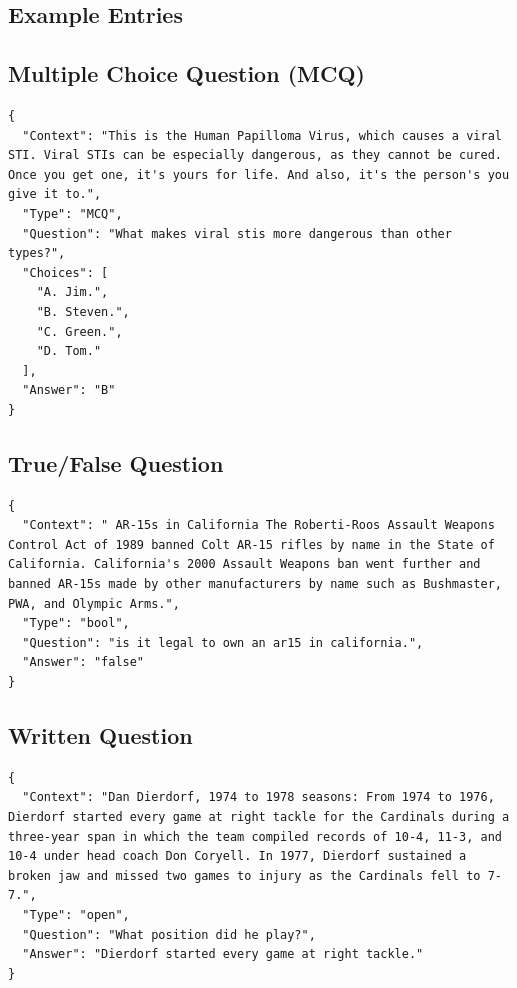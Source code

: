 \begin{center}

\subsection*{Example Entries}

\subsection*{Multiple Choice Question (MCQ)}

\begin{verbatim}
{
  "Context": "This is the Human Papilloma Virus, which causes a viral STI. Viral STIs can be especially dangerous, as they cannot be cured. Once you get one, it's yours for life. And also, it's the person's you give it to.",
  "Type": "MCQ",
  "Question": "What makes viral stis more dangerous than other types?",
  "Choices": [
    "A. Jim.",
    "B. Steven.",
    "C. Green.",
    "D. Tom."
  ],
  "Answer": "B"
}
\end{verbatim}

\subsection*{True/False Question}

\begin{verbatim}
{
  "Context": " AR-15s in California The Roberti-Roos Assault Weapons Control Act of 1989 banned Colt AR-15 rifles by name in the State of California. California's 2000 Assault Weapons ban went further and banned AR-15s made by other manufacturers by name such as Bushmaster, PWA, and Olympic Arms.",
  "Type": "bool",
  "Question": "is it legal to own an ar15 in california.",
  "Answer": "false"
}
\end{verbatim}

\subsection*{Written Question}

\begin{verbatim}
{
  "Context": "Dan Dierdorf, 1974 to 1978 seasons: From 1974 to 1976, Dierdorf started every game at right tackle for the Cardinals during a three-year span in which the team compiled records of 10-4, 11-3, and 10-4 under head coach Don Coryell. In 1977, Dierdorf sustained a broken jaw and missed two games to injury as the Cardinals fell to 7-7.",
  "Type": "open",
  "Question": "What position did he play?",
  "Answer": "Dierdorf started every game at right tackle."
}
\end{verbatim}

\end{center}


